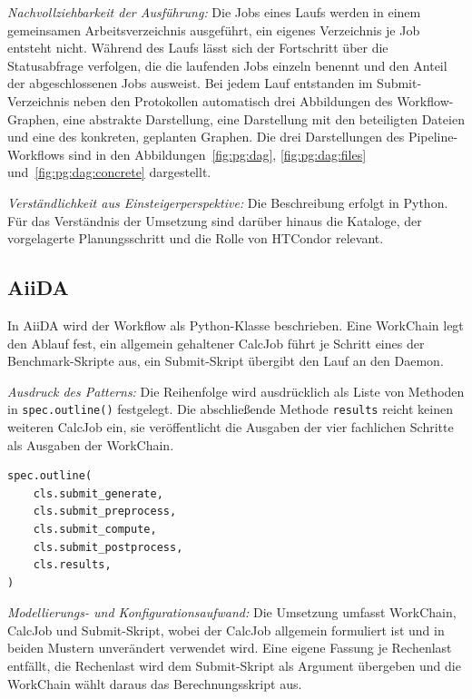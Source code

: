 \emph{Nachvollziehbarkeit der Ausführung:} Die Jobs eines Laufs
werden in einem gemeinsamen Arbeitsverzeichnis ausgeführt, ein
eigenes Verzeichnis je Job entsteht nicht. Während des Laufs lässt
sich der Fortschritt über die Statusabfrage verfolgen, die die
laufenden Jobs einzeln benennt und den Anteil der abgeschlossenen
Jobs ausweist. Bei jedem Lauf entstanden
im Submit-Verzeichnis neben den Protokollen automatisch drei
Abbildungen des Workflow-Graphen, eine abstrakte Darstellung, eine
Darstellung mit den beteiligten Dateien und eine des konkreten,
geplanten Graphen. Die drei Darstellungen des
Pipeline-Workflows sind in den Abbildungen~\ref{fig:pg:dag},
\ref{fig:pg:dag:files} und~\ref{fig:pg:dag:concrete} dargestellt.

\emph{Verständlichkeit aus Einsteigerperspektive:} Die Beschreibung
erfolgt in Python. Für das Verständnis der Umsetzung sind darüber
hinaus die Kataloge, der vorgelagerte
Planungsschritt und die Rolle von HTCondor relevant.

\subsection{AiiDA}
\label{sec:lokal:pipeline:aiida}

In AiiDA wird der Workflow als Python-Klasse beschrieben. Eine
WorkChain legt den Ablauf fest, ein allgemein gehaltener CalcJob
führt je Schritt eines der Benchmark-Skripte aus, ein Submit-Skript
übergibt den Lauf an den Daemon.

\emph{Ausdruck des Patterns:} Die Reihenfolge wird ausdrücklich als
Liste von Methoden in \texttt{spec.outline()} festgelegt. Die
abschließende Methode \texttt{results} reicht keinen weiteren
CalcJob ein, sie veröffentlicht die Ausgaben der vier fachlichen
Schritte als Ausgaben der WorkChain.

\begin{lstlisting}[language=Python,caption={Reihenfolge in spec.outline() (AiiDA, Pipeline)},label={lst:pipe:ai}]
spec.outline(
    cls.submit_generate,
    cls.submit_preprocess,
    cls.submit_compute,
    cls.submit_postprocess,
    cls.results,
)
\end{lstlisting}

\emph{Modellierungs- und Konfigurationsaufwand:} Die Umsetzung
umfasst WorkChain, CalcJob und Submit-Skript, wobei der CalcJob
allgemein formuliert ist und in beiden Mustern unverändert verwendet
wird. Eine eigene Fassung je Rechenlast entfällt, die Rechenlast wird
dem Submit-Skript als Argument übergeben und die WorkChain wählt
daraus das Berechnungsskript aus.

